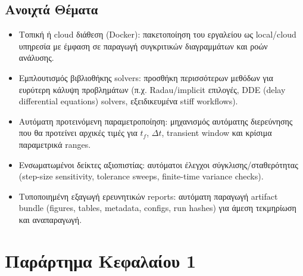 \documentclass[11pt,a4paper]{report}
\begin{document}
\section{Ανοιχτά Θέματα}

\begin{itemize}
\item Τοπική ή cloud διάθεση (Docker): πακετοποίηση του εργαλείου ως local/cloud υπηρεσία με έμφαση σε παραγωγή συγκριτικών διαγραμμάτων και ροών ανάλυσης.
\item Εμπλουτισμός βιβλιοθήκης solvers: προσθήκη περισσότερων μεθόδων για ευρύτερη κάλυψη προβλημάτων (π.χ. Radau/implicit επιλογές, DDE (delay differential equations) solvers, εξειδικευμένα stiff workflows).
\item Αυτόματη προτεινόμενη παραμετροποίηση: μηχανισμός αυτόματης διερεύνησης που θα προτείνει αρχικές τιμές για $t_f$, $\Delta t$, transient window και κρίσιμα παραμετρικά ranges.
\item Ενσωματωμένοι δείκτες αξιοπιστίας: αυτόματοι έλεγχοι σύγκλισης/σταθερότητας (step-size sensitivity, tolerance sweeps, finite-time variance checks).
\item Τυποποιημένη εξαγωγή ερευνητικών reports: αυτόματη παραγωγή artifact bundle (figures, tables, metadata, configs, run hashes) για άμεση τεκμηρίωση και αναπαραγωγή.
\end{itemize}


\appendix

\chapter*{Παράρτημα Κεφαλαίου 1}
\setcounter{section}{0}
\newcommand{\appendixletter}[1]{%
  \ifcase#1%
  \or A\or B\or C\or D\or E\or F\or G\or H\or I\or J%
  \else #1%
  \fi%
}
\renewcommand{\thesection}{\appendixletter{\value{section}}}
\renewcommand{\thesubsection}{\thesection.\arabic{subsection}}
\end{document}
